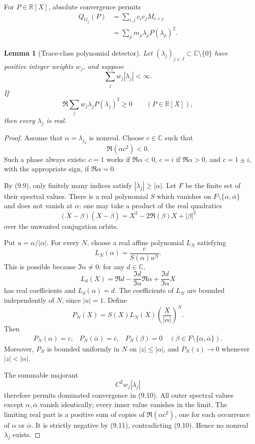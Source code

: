 \documentclass[11pt]{article}
\newtheorem{lemma}[theorem]{Lemma}
\newcommand{\C}{\mathbb C}
\newcommand{\R}{\mathbb R}
\begin{document}
For \(P\in\R[X]\), absolute convergence permits
\[
\begin{aligned}
 Q_{G_\zeta}(P)
 &=\sum_{i,j}c_ic_jM_{i+j}\\
 &=\sum_\rho m_\rho\lambda_\rho P(\lambda_\rho)^2.
\end{aligned}
\tag{9.8}
\]

\begin{lemma}[Trace-class polynomial detector]\label{lem:detector}
Let \((\lambda_j)_{j\in J}\subset\C\setminus\{0\}\) have positive integer
weights \(w_j\), and suppose
\[
 \sum_jw_j|\lambda_j|<\infty.
\tag{9.9}
\]
If
\[
 \Re\sum_jw_j\lambda_jP(\lambda_j)^2\geq0
 \qquad(P\in\R[X]),
\tag{9.10}
\]
then every \(\lambda_j\) is real.
\end{lemma}

\begin{proof}
Assume that \(\alpha=\lambda_{j_0}\) is nonreal.  Choose \(c\in\C\) such that
\[
 \Re(\alpha c^2)<0.
\tag{9.11}
\]
Such a phase always exists: \(c=1\) works if \(\Re\alpha<0\), \(c=i\) if
\(\Re\alpha>0\), and \(c=1\pm i\), with the appropriate sign, if
\(\Re\alpha=0\).

By (9.9), only finitely many indices satisfy
\(|\lambda_j|\geq|\alpha|\).  Let \(F\) be the finite set of their spectral
values.  There is a real polynomial \(S\) which vanishes on
\(F\setminus\{\alpha,\overline\alpha\}\) and does not vanish at \(\alpha\):
one may take a product of the real quadratics
\[
 (X-\beta)(X-\overline\beta)
 =X^2-2\Re(\beta)X+|\beta|^2
\tag{9.12}
\]
over the unwanted conjugation orbits.

Put \(u=\alpha/|\alpha|\).  For every \(N\), choose a real affine polynomial
\(L_N\) satisfying
\[
 L_N(\alpha)=\frac{c}{S(\alpha)u^N}.
\tag{9.13}
\]
This is possible because \(\Im\alpha\neq0\): for any \(d\in\C\),
\[
 L_d(X)=
 \Re d-\frac{\Im d}{\Im\alpha}\Re\alpha
 +\frac{\Im d}{\Im\alpha}X
\tag{9.14}
\]
has real coefficients and \(L_d(\alpha)=d\).  The coefficients of \(L_N\)
are bounded independently of \(N\), since \(|u|=1\).  Define
\[
 P_N(X)=S(X)L_N(X)\left(\frac{X}{|\alpha|}\right)^N.
\tag{9.15}
\]
Then
\[
\begin{array}{lll}
P_N(\alpha)=c,&
P_N(\overline\alpha)=\overline c,&
P_N(\beta)=0\quad
  (\beta\in F\setminus\{\alpha,\overline\alpha\}).
\end{array}
\tag{9.16}
\]
Moreover, \(P_N\) is bounded uniformly in \(N\) on
\(|z|\leq|\alpha|\), and \(P_N(z)\to0\) whenever \(|z|<|\alpha|\).

The summable majorant
\[
 C^2w_j|\lambda_j|
\tag{9.17}
\]
therefore permits dominated convergence in (9.10).  All outer spectral
values except \(\alpha,\overline\alpha\) vanish identically; every inner value
vanishes in the limit.  The limiting real part is a positive sum of copies of
\(\Re(\alpha c^2)\), one for each occurrence of \(\alpha\) or
\(\overline\alpha\).  It is strictly negative by (9.11), contradicting
(9.10).  Hence no nonreal \(\lambda_j\) exists.
\end{proof}
\end{document}
